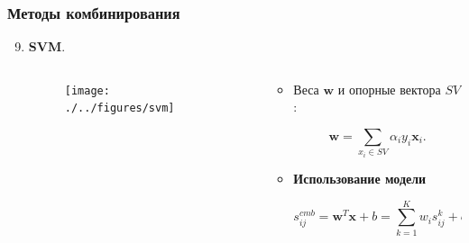 \documentclass{beamer}
\begin{document}
\begin{frame}
\frametitle{Методы комбинирования}

\begin{enumerate}
  \setcounter{enumi}{8}
\item \textbf{SVM}. 


\begin{columns}
  \begin{column}{0.5\textwidth}
\begin{figure}
\centering
\texttt{[image: ./../figures/svm]}
\end{figure}
    
  \end{column}

  \begin{column}{0.5\textwidth}
\begin{itemize}
\item Веса $\mathbf{w}$ и опорные вектора $SV$: 

$$
\mathbf{w} = \sum_{x_i \in SV} \alpha_i y_i \mathbf{x}_i.  
$$

\item \textbf{Использование модели} 

$$
s_{ij}^{cmb} = \mathbf{w}^T\mathbf{x} + b = \sum_{k=1}^K w_i s_{ij}^k + b.
$$

\end{itemize}    
  \end{column}
\end{columns}





\end{enumerate}

\end{frame}
\end{document}
